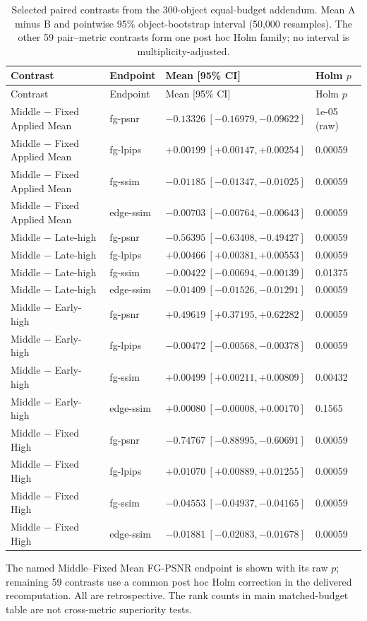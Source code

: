 \documentclass[11pt]{article}
\begin{document}
\begingroup\scriptsize
\begin{longtable}{llll}
\caption{Selected paired contrasts from the 300-object equal-budget addendum. Mean A minus B and pointwise 95\% object-bootstrap interval (50,000 resamples). The other 59 pair--metric contrasts form one post hoc Holm family; no interval is multiplicity-adjusted.}\label{tab:budget300paired}\\
\toprule Contrast & Endpoint & Mean [95\% CI] & Holm $p$ \\
\midrule\endfirsthead
\toprule Contrast & Endpoint & Mean [95\% CI] & Holm $p$ \\
\midrule\endhead
Middle $-$ Fixed Applied Mean & fg-psnr & $-0.13326\ [-0.16979,-0.09622]$ & 1e-05 (raw) \\
Middle $-$ Fixed Applied Mean & fg-lpips & $+0.00199\ [+0.00147,+0.00254]$ & 0.00059 \\
Middle $-$ Fixed Applied Mean & fg-ssim & $-0.01185\ [-0.01347,-0.01025]$ & 0.00059 \\
Middle $-$ Fixed Applied Mean & edge-ssim & $-0.00703\ [-0.00764,-0.00643]$ & 0.00059 \\
Middle $-$ Late-high & fg-psnr & $-0.56395\ [-0.63408,-0.49427]$ & 0.00059 \\
Middle $-$ Late-high & fg-lpips & $+0.00466\ [+0.00381,+0.00553]$ & 0.00059 \\
Middle $-$ Late-high & fg-ssim & $-0.00422\ [-0.00694,-0.00139]$ & 0.01375 \\
Middle $-$ Late-high & edge-ssim & $-0.01409\ [-0.01526,-0.01291]$ & 0.00059 \\
Middle $-$ Early-high & fg-psnr & $+0.49619\ [+0.37195,+0.62282]$ & 0.00059 \\
Middle $-$ Early-high & fg-lpips & $-0.00472\ [-0.00568,-0.00378]$ & 0.00059 \\
Middle $-$ Early-high & fg-ssim & $+0.00499\ [+0.00211,+0.00809]$ & 0.00432 \\
Middle $-$ Early-high & edge-ssim & $+0.00080\ [-0.00008,+0.00170]$ & 0.1565 \\
Middle $-$ Fixed High & fg-psnr & $-0.74767\ [-0.88995,-0.60691]$ & 0.00059 \\
Middle $-$ Fixed High & fg-lpips & $+0.01070\ [+0.00889,+0.01255]$ & 0.00059 \\
Middle $-$ Fixed High & fg-ssim & $-0.04553\ [-0.04937,-0.04165]$ & 0.00059 \\
Middle $-$ Fixed High & edge-ssim & $-0.01881\ [-0.02083,-0.01678]$ & 0.00059 \\
\bottomrule
\end{longtable}\endgroup
The named Middle--Fixed Mean FG-PSNR endpoint is shown with its raw $p$; remaining 59 contrasts use a common post hoc Holm correction in the delivered recomputation. All are retrospective. The rank counts in main matched-budget table are not cross-metric superiority tests.
\end{document}
